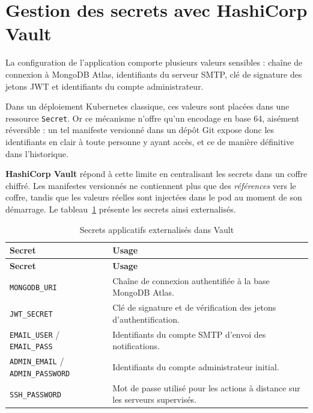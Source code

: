 \section{Gestion des secrets avec HashiCorp Vault}
La configuration de l'application comporte plusieurs valeurs sensibles : chaîne de
connexion à MongoDB Atlas, identifiants du serveur SMTP, clé de signature des jetons JWT
et identifiants du compte administrateur.

Dans un déploiement Kubernetes classique, ces valeurs sont placées dans une ressource
\texttt{Secret}. Or ce mécanisme n'offre qu'un encodage en base 64, aisément réversible :
un tel manifeste versionné dans un dépôt Git expose donc les identifiants en clair à
toute personne y ayant accès, et ce de manière définitive dans l'historique.

\textbf{HashiCorp Vault} répond à cette limite en centralisant les secrets dans un coffre
chiffré. Les manifestes versionnés ne contiennent plus que des \emph{références} vers le
coffre, tandis que les valeurs réelles sont injectées dans le pod au moment de son
démarrage. Le tableau~\ref{tab:vault} présente les secrets ainsi externalisés.

\renewcommand{\arraystretch}{1.3}
\begin{longtable}{|>{\raggedright\arraybackslash}p{4.6cm}
                  |>{\raggedright\arraybackslash}p{9.2cm}|}
\hline
\textbf{Secret} & \textbf{Usage} \\
\hline
\endfirsthead

\hline
\textbf{Secret} & \textbf{Usage} \\
\hline
\endhead

\hline
\caption{Secrets applicatifs externalisés dans Vault}
\label{tab:vault}
\endlastfoot

\texttt{MONGODB\_URI} & Chaîne de connexion authentifiée à la base MongoDB Atlas. \\
\hline
\texttt{JWT\_SECRET} & Clé de signature et de vérification des jetons d'authentification. \\
\hline
\texttt{EMAIL\_USER} / \texttt{EMAIL\_PASS} & Identifiants du compte SMTP d'envoi des notifications. \\
\hline
\texttt{ADMIN\_EMAIL} / \texttt{ADMIN\_PASSWORD} & Identifiants du compte administrateur initial. \\
\hline
\texttt{SSH\_PASSWORD} & Mot de passe utilisé pour les actions à distance sur les serveurs supervisés. \\
\hline

\end{longtable}

